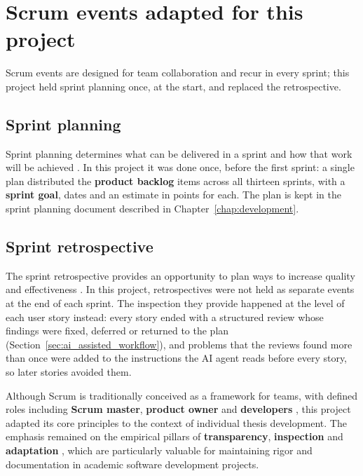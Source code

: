 \section{Scrum events adapted for this project}

Scrum events are designed for team collaboration and recur in every sprint; this project held sprint planning once, at the start, and replaced the retrospective.

\subsection{Sprint planning}

Sprint planning determines what can be delivered in a sprint and how that work will be achieved \autocite{schwaber2020scrum}. In this project it was done once, before the first sprint: a single plan distributed the \textbf{product backlog} items across all thirteen sprints, with a \textbf{sprint goal}, dates and an estimate in points for each. The plan is kept in the sprint planning document described in Chapter~\ref{chap:development}.

\subsection{Sprint retrospective}

The sprint retrospective provides an opportunity to plan ways to increase quality and effectiveness \autocite{schwaber2020scrum}. In this project, retrospectives were not held as separate events at the end of each sprint. The inspection they provide happened at the level of each user story instead: every story ended with a structured review whose findings were fixed, deferred or returned to the plan (Section~\ref{sec:ai_assisted_workflow}), and problems that the reviews found more than once were added to the instructions the AI agent reads before every story, so later stories avoided them.

Although Scrum is traditionally conceived as a framework for teams, with defined roles including \textbf{Scrum master}, \textbf{product owner} and \textbf{developers} \autocite{schwaber2020scrum}, this project adapted its core principles to the context of individual thesis development. The emphasis remained on the empirical pillars of \textbf{transparency}, \textbf{inspection} and \textbf{adaptation} \autocite{schwaber2020scrum}, which are particularly valuable for maintaining rigor and documentation in academic software development projects.

